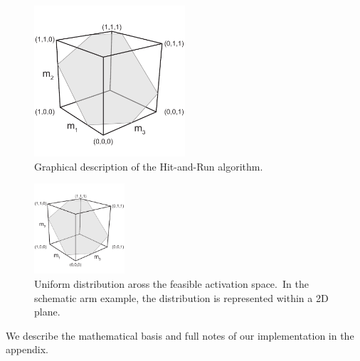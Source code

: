 \begin{figure}[h]
\centering
\includegraphics[width=0.5\textwidth,page=10]{sections/figs/HitandRunSchematics_all.pdf}
\caption{Graphical description of the Hit-and-Run algorithm.}
\label{fig:hitruncube}
\end{figure}

\begin{figure}[h]
\centering
\includegraphics[width=0.3\textwidth,page=9]{sections/figs/HitandRunSchematics_all.pdf}
\caption{Uniform distribution aross the feasible activation space.\ In the schematic arm example, the distribution is represented within a 2D plane.}
\label{fig:posthitrun_distribution}
\end{figure}

We describe the mathematical basis and full notes of our implementation in the appendix.

